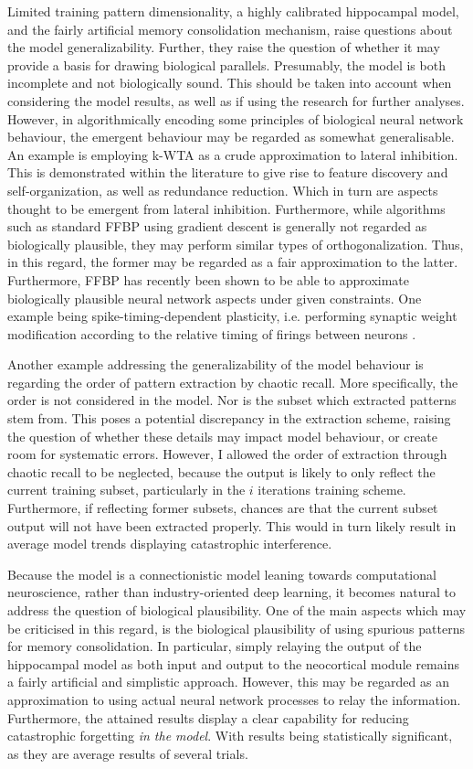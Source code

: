 Limited training pattern dimensionality, a highly calibrated hippocampal model, and the fairly artificial memory consolidation mechanism, raise questions about the model generalizability. Further, they raise the question of whether it may provide a basis for drawing biological parallels.
Presumably, the model is both incomplete and not biologically sound. This should be taken into account when considering the model results, as well as if using the research for further analyses. However, in algorithmically encoding some principles of biological neural network behaviour, the emergent behaviour may be regarded as somewhat generalisable.
An example is employing k-WTA as a crude approximation to lateral inhibition. This is demonstrated within the literature to give rise to feature discovery and self-organization, as well as redundance reduction. Which in turn are aspects thought to be emergent from lateral inhibition. 
Furthermore, while algorithms such as standard FFBP using gradient descent is generally not regarded as biologically plausible, they may perform similar types of orthogonalization. Thus, in this regard, the former may be regarded as a fair approximation to the latter. Furthermore, FFBP has recently been shown to be able to approximate biologically plausible neural network aspects under given constraints. One example being spike-timing-dependent plasticity, i.e. performing synaptic weight modification according to the relative timing of firings between neurons \citep{Bengio2015}.

Another example addressing the generalizability of the model behaviour is regarding the order of pattern extraction by chaotic recall. More specifically, the order is not considered in the model. Nor is the subset which extracted patterns stem from. This poses a potential discrepancy in the extraction scheme, raising the question of whether these details may impact model behaviour, or create room for systematic errors. However, I allowed the order of extraction through chaotic recall to be neglected, because the output is likely to only reflect the current training subset, particularly in the $i$ iterations training scheme. Furthermore, if reflecting former subsets, chances are that the current subset output will not have been extracted properly. This would in turn likely result in average model trends displaying catastrophic interference.

Because the model is a connectionistic model leaning towards computational neuroscience, rather than industry-oriented deep learning, it becomes natural to address the question of biological plausibility. One of the main aspects which may be criticised in this regard, is the biological plausibility of using spurious patterns for memory consolidation. In particular, simply relaying the output of the hippocampal model as both input and output to the neocortical module remains a fairly artificial and simplistic approach. However, this may be regarded as an approximation to using actual neural network processes to relay the information. Furthermore, the attained results display a clear capability for reducing catastrophic forgetting \textit{in the model}. With results being statistically significant, as they are average results of several trials.


